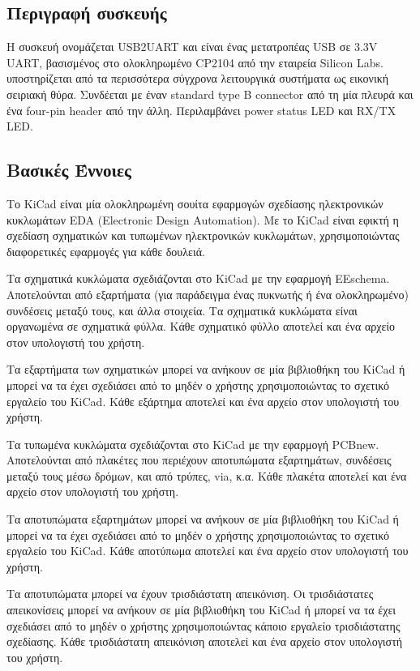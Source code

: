 \documentclass[a4paper]{article}
\begin{document}
\subsection{Περιγραφή συσκευής}
Η συσκευή ονομάζεται USB2UART και είναι ένας μετατροπέας USB σε 3.3V UART, βασισμένος στο ολοκληρωμένο CP2104 από την εταιρεία Silicon Labs. υποστηρίζεται από τα περισσότερα σύγχρονα λειτουργικά συστήματα ως εικονική σειριακή θύρα. Συνδέεται με έναν standard type B connector από τη μία πλευρά και ένα four-pin header από την άλλη. Περιλαμβάνει power status LED και RX/TX LED.

\subsection{Βασικές Έννοιες}
Το KiCad είναι μία ολοκληρωμένη σουίτα εφαρμογών σχεδίασης ηλεκτρονικών κυκλωμάτων EDA (Electronic Design Automation). Με το KiCad είναι εφικτή η σχεδίαση σχηματικών και τυπωμένων ηλεκτρονικών κυκλωμάτων, χρησιμοποιώντας διαφορετικές εφαρμογές για κάθε δουλειά.

Τα σχηματικά κυκλώματα σχεδιάζονται στο KiCad με την εφαρμογή EEschema. Αποτελούνται από εξαρτήματα (για παράδειγμα ένας πυκνωτής ή ένα ολοκληρωμένο) συνδέσεις μεταξύ τους, και άλλα στοιχεία. Τα σχηματικά κυκλώματα είναι οργανωμένα σε σχηματικά φύλλα. Κάθε σχηματικό φύλλο αποτελεί και ένα αρχείο στον υπολογιστή του χρήστη.

Τα εξαρτήματα των σχηματικών μπορεί να ανήκουν σε μία βιβλιοθήκη του KiCad ή μπορεί να τα έχει σχεδιάσει από το μηδέν ο χρήστης χρησιμοποιώντας το σχετικό εργαλείο του KiCad. Κάθε εξάρτημα αποτελεί και ένα αρχείο στον υπολογιστή του χρήστη.

Τα τυπωμένα κυκλώματα σχεδιάζονται στο KiCad με την εφαρμογή PCBnew. Αποτελούνται από πλακέτες που περιέχουν αποτυπώματα εξαρτημάτων, συνδέσεις μεταξύ τους μέσω δρόμων, και από τρύπες, via, κ.α.
Κάθε πλακέτα αποτελεί και ένα αρχείο στον υπολογιστή του χρήστη. 

Τα αποτυπώματα εξαρτημάτων μπορεί να ανήκουν σε μία βιβλιοθήκη του KiCad ή μπορεί να τα έχει σχεδιάσει από το μηδέν ο χρήστης χρησιμοποιώντας το σχετικό εργαλείο του KiCad. Κάθε αποτύπωμα αποτελεί και ένα αρχείο στον υπολογιστή του χρήστη. 

Τα αποτυπώματα μπορεί να έχουν τρισδιάστατη απεικόνιση. Οι τρισδιάστατες απεικονίσεις μπορεί να ανήκουν σε μία βιβλιοθήκη του KiCad ή μπορεί να τα έχει σχεδιάσει από το μηδέν ο χρήστης χρησιμοποιώντας κάποιο εργαλείο τρισδιάστατης σχεδίασης. Κάθε τρισδιάστατη απεικόνιση αποτελεί και ένα αρχείο στον υπολογιστή του χρήστη. 
\end{document}
